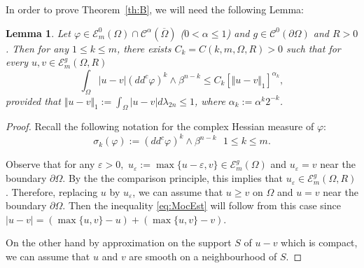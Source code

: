\documentclass[JEP,XML,SOM,Unicode]{cedram}
\newtheorem{lemma}[theorem]{Lemma}
\theoremstyle{definition}
\newcommand{\Cc}{\mathcal{C}}
\begin{document}
In order to prove Theorem~\ref{th:B}, we will need the following Lemma:
\begin{lemma}\label{lem:ModC}
Let $\varphi\in \mathcal{E}^0_m(\Omega)\cap \Cc^{\alpha} (\overline\Omega)$ ($ 0 < \alpha \leq 1$) and $g \in \Cc^0 (\partial \Omega)$ and $R > 0$.
Then for any $1 \leq k\leq m$, there exists $C_k = C (k,m,\Omega,R) >0$ such that for every $u,v\in \mathcal{E}^g_m(\Omega,R)$
\begin{equation} \label{eq:MocEst}
\int_{\Omega}|u-v|(dd^c\varphi)^k\wedge\beta^{n-k}\leq C_k \left[\Vert u-v \Vert_1\right]^{\alpha_k},
\end{equation}
provided that $\Vert u-v \Vert_1:= \int_{\Omega} \vert u - v\vert d \lambda_{2 n} \leq 1$, where $\alpha_k:= \alpha^k 2^{-k}$.
\end{lemma}
\begin{proof}
Recall the following notation for the complex Hessian measure of $\varphi$:
\[
\sigma_k{(\varphi)}:= (dd^c\varphi)^k\wedge\beta^{n-k} \ \ \ 1 \leq k\leq m.
\]

Observe that for any $\varepsilon > 0,$ $ u_\varepsilon:= \max \{u - \varepsilon, v \} \in \mathcal{E}^g_m(\Omega)$ and $u_\varepsilon = v$ near the boundary $\partial \Omega$. By the the comparison principle, this implies that
$u_\varepsilon \in \mathcal{E}^g_m(\Omega,R)$. Therefore, replacing $u$ by $u_\varepsilon$, we can assume that $u \geq v$ on $\Omega$ and $u = v$ near the boundary $\partial \Omega$. Then the inequality \eqref{eq:MocEst} will follow from this case since $\vert u - v \vert = ( \max\{u,v\} - u) + (\max\{u,v\} - v)$.

On the other hand by approximation on the support $S$ of $u-v$ which is compact, we can assume that $u$ and $ v $ are smooth on a neighbourhood of $S$.


\end{proof}
\end{document}
